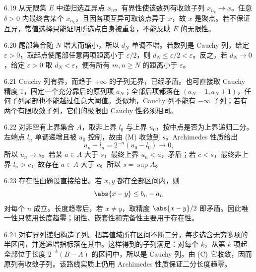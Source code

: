 \begin{solution}{6.19}
从无限集 \(E\) 中递归选互异点 \(x_n\)。有界性使该数列有收敛子列 \(x_{n_k}\to x\)。任意 \(\delta>0\) 内最终含某个 \(x_{n_k}\)，且因各项互异可取该点异于 \(x\)，故 \(x\) 是聚点。若不保证互异，常值选择只能证明所选点自身被重复，不能反映 \(E\) 的无限性。
\end{solution}

\begin{solution}{6.20}
尾部集合随 \(N\) 增大而缩小，所以 \(d_N\) 单调不增。若数列是 Cauchy 列，给定 \(\varepsilon>0\)，取起点使尾部任意两项距离小于 \(\varepsilon/2\)，则 \(d_N\le\varepsilon/2<\varepsilon\)。反之，若 \(d_N\to0\)，给定 \(\varepsilon>0\) 取 \(d_N<\varepsilon\)，便有所有 \(m,n\ge N\) 的距离小于 \(\varepsilon\)。
\end{solution}

\begin{solution}{6.21}
Cauchy 列有界，而趋于 \(+\infty\) 的子列无界，已经矛盾。也可直接取 Cauchy 精度 \(1\)，固定一个充分靠后的原列项 \(a_N\)；全部后项都落在 \((a_N-1,a_N+1)\)，任何子列尾部也不能越过任意大阈值。类似地，Cauchy 列不能有 \(-\infty\) 子列；若有两个有限收敛子列，它们的极限由 Cauchy 性必须相同。
\end{solution}

\begin{solution}{6.22}
对非空有上界集合 \(A\)，取非上界 \(l_0\) 与上界 \(u_0\)，按中点是否为上界递归二分。左端点 \(l_n\) 单调递增且被 \(u_0\) 控制，故由 (M) 收敛到 \(s\)。Archimedes 性质给出
\[
 u_n-l_n=2^{-n}(u_0-l_0)\to0,
\]
所以 \(u_n\to s\)。若某 \(a\in A\) 大于 \(s\)，最终上界 \(u_n<a\)，矛盾；若 \(c<s\)，最终非上界 \(l_n>c\)，故存在 \(a\in A\) 大于 \(c\)。所以 \(s=\sup A\)。
\end{solution}

\begin{solution}{6.23}
存在性由题设直接给出。若 \(x,y\) 都在全部区间内，则
\[
 \abs{x-y}\le b_n-a_n
\]
对每个 \(n\) 成立。长度趋零后，若 \(x\ne y\)，取精度 \(\abs{x-y}/2\) 即矛盾。因此唯一性只使用长度趋零；闭性、嵌套性和完备性主要用于存在性。
\end{solution}

\begin{solution}{6.24}
对有界列递归构造子列。把其值域所在区间不断二分，每步选含无穷多项的半区间，并选递增指标落在其中。这样得到的子列满足：对每个 \(k\)，从第 \(k\) 项起全部位于长度 \(2^{-k}(B-A)\) 的区间中，所以是 Cauchy 列。由 (C) 它收敛，因而原列有收敛子列。该路线实质上仍用 Archimedes 性质保证二分长度趋零。
\end{solution}

